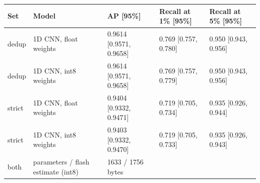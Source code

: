 \begin{tabular}{lllll}
\toprule
Set & Model & AP [95\%] & Recall at 1\% [95\%] & Recall at 5\% [95\%] \\
\midrule
dedup & 1D CNN, float weights & 0.9614 [0.9571, 0.9658] & 0.769 [0.757, 0.780] & 0.950 [0.943, 0.956] \\
dedup & 1D CNN, int8 weights & 0.9614 [0.9571, 0.9658] & 0.769 [0.757, 0.779] & 0.950 [0.943, 0.956] \\
strict & 1D CNN, float weights & 0.9404 [0.9332, 0.9471] & 0.719 [0.705, 0.734] & 0.935 [0.926, 0.944] \\
strict & 1D CNN, int8 weights & 0.9403 [0.9332, 0.9470] & 0.719 [0.705, 0.733] & 0.935 [0.926, 0.943] \\
both & parameters / flash estimate (int8) & 1633 / 1756 bytes &  &  \\
\bottomrule
\end{tabular}
